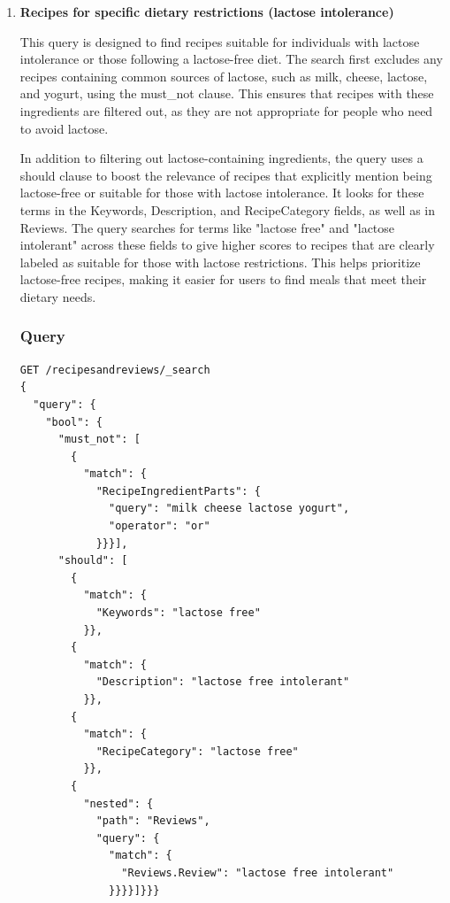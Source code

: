 \begin{enumerate}
    \item {}
          \textbf{Recipes for specific dietary restrictions (lactose intolerance)}

    This query is designed to find recipes suitable for individuals with lactose intolerance or those following a lactose-free diet. The search first excludes any recipes containing common sources of lactose, such as milk, cheese, lactose, and yogurt, using the must\_not clause. This ensures that recipes with these ingredients are filtered out, as they are not appropriate for people who need to avoid lactose.

    In addition to filtering out lactose-containing ingredients, the query uses a should clause to boost the relevance of recipes that explicitly mention being lactose-free or suitable for those with lactose intolerance. It looks for these terms in the Keywords, Description, and RecipeCategory fields, as well as in Reviews. The query searches for terms like "lactose free" and "lactose intolerant" across these fields to give higher scores to recipes that are clearly labeled as suitable for those with lactose restrictions. This helps prioritize lactose-free recipes, making it easier for users to find meals that meet their dietary needs.

    \subsubsection{Query}
    \begin{lstlisting}[language=Elasticsearch]
GET /recipesandreviews/_search
{
  "query": {
    "bool": {
      "must_not": [
        {
          "match": {
            "RecipeIngredientParts": {
              "query": "milk cheese lactose yogurt",
              "operator": "or"
            }}}],
      "should": [
        {
          "match": {
            "Keywords": "lactose free"
          }},
        {
          "match": {
            "Description": "lactose free intolerant"
          }},
        {
          "match": {
            "RecipeCategory": "lactose free"
          }},
        {
          "nested": {
            "path": "Reviews",
            "query": {
              "match": {
                "Reviews.Review": "lactose free intolerant"
              }}}}]}}}
    \end{lstlisting}


\end{enumerate}
